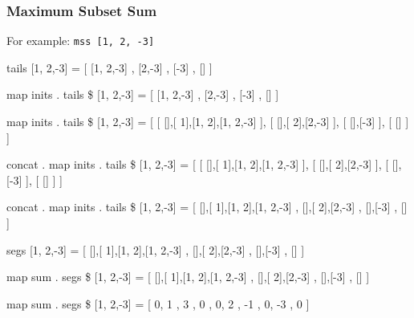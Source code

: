 \documentclass{beamer}
\newcommand{\cb}[1]{{\color{violet}#1}}
\begin{document}
\begin{frame}[fragile,t]
    \frametitle{Maximum Subset Sum}
    
For example: \verb?mss [1, 2, -3]?

\begin{center}
\begin{overprint}

\begin{semiverbatim}
                       \cb{tails} [1, 2,-3] = 
  [                  [1, 2,-3]  , 
              [2,-3]  , 
         [-3]  , 
      []   ]
\end{semiverbatim}

\begin{semiverbatim}
         \cb{map inits . tails} \$ [1, 2,-3] = 
  [                  [1, 2,-3]  , 
              [2,-3]  , 
         [-3]  , 
      []   ]
\end{semiverbatim}

\begin{semiverbatim}
         \cb{map inits . tails} \$ [1, 2,-3] = 
  [ [ [],[ 1],[1, 2],[1, 2,-3] ], 
    [ [],[ 2],[2,-3] ], 
    [ [],[-3] ], 
    [ [] ] ]
\end{semiverbatim}

\begin{semiverbatim}
\cb{concat . map inits . tails} \$ [1, 2,-3] = 
  [ [ [],[ 1],[1, 2],[1, 2,-3] ], 
    [ [],[ 2],[2,-3] ], 
    [ [],[-3] ], 
    [ [] ] ]
\end{semiverbatim}

\begin{semiverbatim}
\cb{concat . map inits . tails} \$ [1, 2,-3] = 
  [   [],[ 1],[1, 2],[1, 2,-3]  , 
      [],[ 2],[2,-3]  , 
      [],[-3]  , 
      []   ]
\end{semiverbatim}

\begin{semiverbatim}
                        \cb{segs} [1, 2,-3] = 
  [   [],[ 1],[1, 2],[1, 2,-3]  , 
      [],[ 2],[2,-3]  , 
      [],[-3]  , 
      []   ]
\end{semiverbatim}

\begin{semiverbatim}
            \cb{map sum . segs} \$ [1, 2,-3] = 
  [   [],[ 1],[1, 2],[1, 2,-3]  , 
      [],[ 2],[2,-3]  , 
      [],[-3]  , 
      []   ]
\end{semiverbatim}

\begin{semiverbatim}
            \cb{map sum . segs} \$ [1, 2,-3] = 
  [    0,  1 ,    3 ,       0   , 
       0,  2 ,   -1   , 
       0, -3  , 
       0   ]
\end{semiverbatim}


\end{overprint}
\end{center}
\end{frame}
\end{document}
